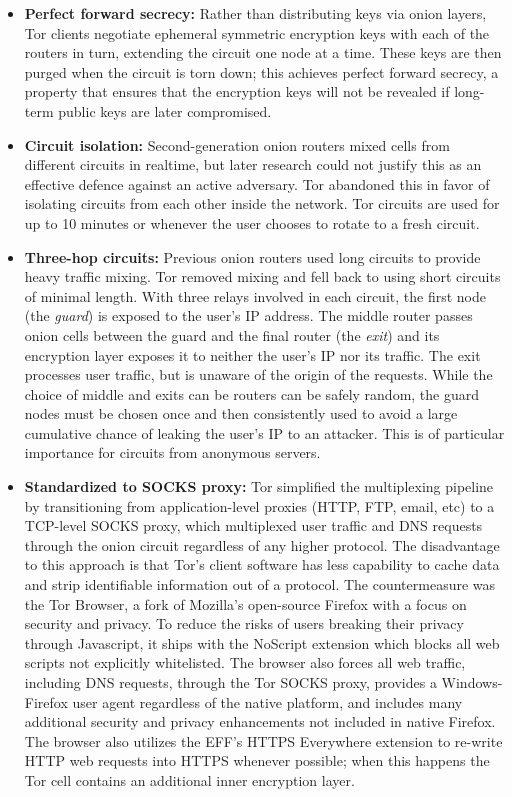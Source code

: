 \begin{itemize}
	\item \textbf{Perfect forward secrecy:} Rather than distributing keys via onion layers, Tor clients negotiate ephemeral symmetric encryption keys with each of the routers in turn, extending the circuit one node at a time. These keys are then purged when the circuit is torn down; this achieves perfect forward secrecy, a property that ensures that the encryption keys will not be revealed if long-term public keys are later compromised.
	\item \textbf{Circuit isolation:} Second-generation onion routers mixed cells from different circuits in realtime, but later research could not justify this as an effective defence against an active adversary.\cite{syverson2011peel} Tor abandoned this in favor of isolating circuits from each other inside the network. Tor circuits are used for up to 10 minutes or whenever the user chooses to rotate to a fresh circuit.
	\item \textbf{Three-hop circuits:} Previous onion routers used long circuits to provide heavy traffic mixing. Tor removed mixing and fell back to using short circuits of minimal length. With three relays involved in each circuit, the first node (the \emph{guard}) is exposed to the user's IP address. The middle router passes onion cells between the guard and the final router (the \emph{exit}) and its encryption layer exposes it to neither the user's IP nor its traffic. The exit processes user traffic, but is unaware of the origin of the requests. While the choice of middle and exits can be routers can be safely random, the guard nodes must be chosen once and then consistently used to avoid a large cumulative chance of leaking the user's IP to an attacker. This is of particular importance for circuits from anonymous servers.\cite{bauer2007low}\cite{overlier2006locating}
	\item \textbf{Standardized to SOCKS proxy:} Tor simplified the multiplexing pipeline by transitioning from application-level proxies (HTTP, FTP, email, etc) to a TCP-level SOCKS proxy, which multiplexed user traffic and DNS requests through the onion circuit regardless of any higher protocol. The disadvantage to this approach is that Tor's client software has less capability to cache data and strip identifiable information out of a protocol. The countermeasure was the Tor Browser, a fork of Mozilla's open-source Firefox with a focus on security and privacy. To reduce the risks of users breaking their privacy through Javascript, it ships with the NoScript extension which blocks all web scripts not explicitly whitelisted. The browser also forces all web traffic, including DNS requests, through the Tor SOCKS proxy, provides a Windows-Firefox user agent regardless of the native platform, and includes many additional security and privacy enhancements not included in native Firefox. The browser also utilizes the EFF's HTTPS Everywhere extension to re-write HTTP web requests into HTTPS whenever possible; when this happens the Tor cell contains an additional inner encryption layer.

\end{itemize}
